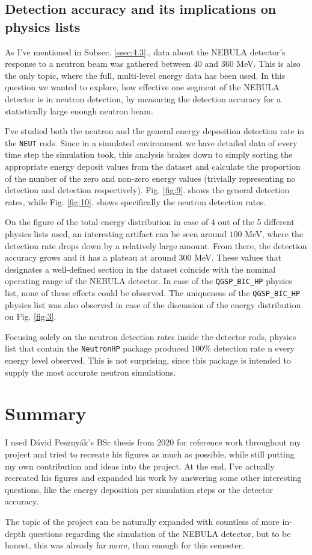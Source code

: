 \begin{multicols}{2}
\subsection{Detection accuracy and its implications on physics lists} \label{ssec:6.3}
As I've mentioned in Subsec. \ref{ssec:4.3}., data about the NEBULA detector's response to a neutron beam was gathered between $40$ and $360$ MeV. This is also the only topic, where the full, multi-level energy data has been used. In this question we wanted to explore, how effective one segment of the NEBULA detector is in neutron detection, by measuring the detection accuracy for a statistically large enough neutron beam.

I've studied both the neutron and the general energy deposition detection rate in the \texttt{NEUT} rods. Since in a simulated environment we have detailed data of every time step the simulation took, this analysis brakes down to simply sorting the appropriate energy deposit values from the dataset and calculate the proportion of the number of the zero and non-zero energy values (trivially representing no detection and detection respectively). Fig. \ref{fig:9}. shows the general detection rates, while Fig. \ref{fig:10}. shows specifically the neutron detection rates.

On the figure of the total energy distribution in case of 4 out of the 5 different physics lists used, an interesting artifact can be seen around $100$ MeV, where the detection rate drops down by a relatively large amount. From there, the detection accuracy grows and it has a plateau at around $300$ MeV. These values that designates a well-defined section in the dataset coincide with the nominal operating range of the NEBULA detector. In case of the \texttt{QGSP\_BIC\_HP} physics list, none of these effects could be observed. The uniqueness of the \texttt{QGSP\_BIC\_HP} physics list was also observed in case of the discussion of the energy distribution on Fig. \ref{fig:3}.

Focusing solely on the neutron detection rates inside the detector rods, physics list that contain the \texttt{NeutronHP} package produced $100\%$ detection rate n every energy level observed. This is not surprising, since this package is intended to supply the most accurate neutron simulations.

\section{Summary} \label{sec:7}
I used Dávid Pesznyák's BSc thesis from 2020 for reference work throughout my project and tried to recreate his figures as much as possible, while still putting my own contribution and ideas into the project. At the end, I've actually recreated his figures and expanded his work by answering some other interesting questions, like the energy deposition per simulation steps or the detector accuracy.

The topic of the project can be naturally expanded with countless of more in-depth questions regarding the simulation of the NEBULA detector, but to be honest, this was already far more, than enough for this semester.

\end{multicols}
